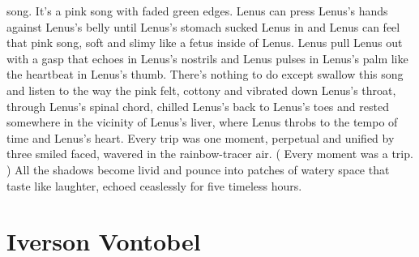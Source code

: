 \documentclass[12pt]{book}
\begin{document}
song. It's a pink song with faded green edges. Lenus can press Lenus's hands against Lenus's belly until Lenus's stomach sucked Lenus in and Lenus can feel that pink song, soft and slimy like a fetus inside of Lenus. Lenus pull Lenus out with a gasp that echoes in Lenus's nostrils and Lenus pulses in Lenus's palm like the heartbeat in Lenus's thumb. There's nothing to do except swallow this song and listen to the way the pink felt, cottony and vibrated down Lenus's throat, through Lenus's spinal chord, chilled Lenus's back to Lenus's toes and rested somewhere in the vicinity of Lenus's liver, where Lenus throbs to the tempo of time and Lenus's heart. Every trip was one moment, perpetual and unified by three smiled faced, wavered in the rainbow-tracer air. ( Every moment was a trip. ) All the shadows become livid and pounce into patches of watery space that taste like laughter, echoed ceaslessly for five timeless hours.



\chapter{Iverson Vontobel}
\end{document}
